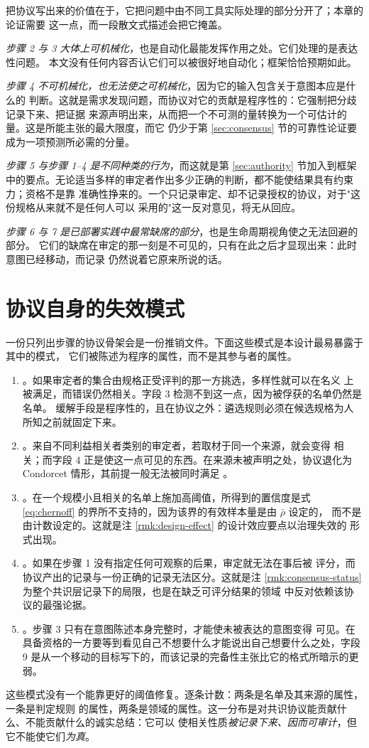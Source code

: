 把协议写出来的价值在于，它把问题中由不同工具实际处理的部分分开了；本章的论证需要
这一点，而一段散文式描述会把它掩盖。

\emph{步骤 2 与 3 大体上可机械化}，也是自动化最能发挥作用之处。它们处理的是表达性问题。
本文没有任何内容否认它们可以被很好地自动化；框架恰恰预期如此。

\emph{步骤 4 不可机械化，也无法使之可机械化}，因为它的输入包含关于意图本应是什么的
判断。这就是需求发现问题，而协议对它的贡献是程序性的：它强制把分歧记录下来、把证据
来源声明出来，从而把一个不可测的量转换为一个可估计的量。这是所能主张的最大限度，而它
仍少于第 \ref{sec:consensus} 节的可靠性论证要成为一项预测所必需的分量。

\emph{步骤 5 与步骤 1--4 是不同种类的行为}，而这就是第 \ref{sec:authority} 节加入到框架
中的要点。无论适当多样的审定者作出多少正确的判断，都不能使结果具有约束力；资格不是靠
准确性挣来的。一个只记录审定、却不记录授权的协议，对于"这份规格从来就不是任何人可以
采用的"这一反对意见，将无从回应。

\emph{步骤 6 与 7 是已部署实践中最常缺席的部分}，也是生命周期视角使之无法回避的部分。
它们的缺席在审定的那一刻是不可见的，只有在此之后才显现出来：此时意图已经移动，而记录
仍然说着它原来所说的话。

\section{协议自身的失效模式}

一份只列出步骤的协议骨架会是一份推销文件。下面这些模式是本设计最易暴露于其中的模式，
它们被陈述为程序的属性，而不是其参与者的属性。

\begin{enumerate}[label=(\alph*)]
\item {}。如果审定者的集合由规格正受评判的那一方挑选，多样性就可以在名义
      上被满足，而错误仍然相关。字段 3 检测不到这一点，因为被俘获的名单仍然是名单。
      缓解手段是程序性的，且在协议之外：遴选规则必须在候选规格为人所知之前就固定下来。
\item {}。来自不同利益相关者类别的审定者，若取材于同一个来源，就会变得
      相关；而字段 4 正是使这一点可见的东西。在来源未被声明之处，协议退化为 Condorcet
      情形，其前提一般无法被同时满足 \cite{dietrich2008}。
\item {}。在一个规模小且相关的名单上施加高阈值，所得到的置信度是式
      \eqref{eq:chernoff} 的界所不支持的，因为该界的有效样本量是由 $\bar\rho$ 设定的，
      而不是由计数设定的。这就是注 \ref{rmk:design-effect} 的设计效应要点以治理失效的
      形式出现。
\item {}。如果在步骤 1 没有指定任何可观察的后果，审定就无法在事后被
      评分，而协议产出的记录与一份正确的记录无法区分。这就是注
      \ref{rmk:consensus-status} 为整个共识层记录下的局限，也是在缺乏可评分结果的领域
      中反对依赖该协议的最强论据。
\item {}。步骤 3 只有在意图陈述本身完整时，才能使未被表达的意图变得
      可见。在具备资格的一方要等到看见自己不想要什么才能说出自己想要什么之处，字段 9
      是从一个移动的目标写下的，而该记录的完备性主张比它的格式所暗示的更弱。
\end{enumerate}

这些模式没有一个能靠更好的阈值修复。逐条计数：两条是名单及其来源的属性，一条是判定规则
的属性，两条是领域的属性。这一分布是对共识协议能贡献什么、不能贡献什么的诚实总结：它可以
使相关性质\emph{被记录下来、因而可审计}，但它不能使它们\emph{为真}。
